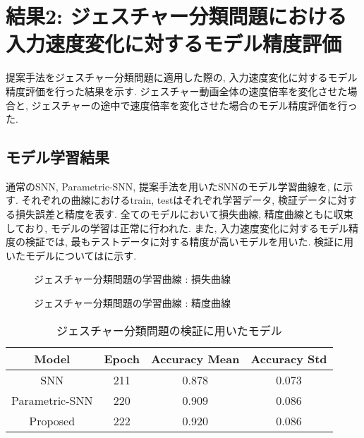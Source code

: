\section{結果2: ジェスチャー分類問題における入力速度変化に対するモデル精度評価} \label{sec:result2}
提案手法をジェスチャー分類問題に適用した際の, 入力速度変化に対するモデル精度評価を行った結果を示す.
ジェスチャー動画全体の速度倍率を変化させた場合と, ジェスチャーの途中で速度倍率を変化させた場合のモデル精度評価を行った.

\subsection{モデル学習結果}
通常のSNN, Parametric-SNN, 提案手法を用いたSNNのモデル学習曲線を, に示す.
それぞれの曲線におけるtrain, testはそれぞれ学習データ, 検証データに対する損失誤差と精度を表す.
全てのモデルにおいて損失曲線, 精度曲線ともに収束しており, モデルの学習は正常に行われた.
また, 入力速度変化に対するモデル精度の検証では, 最もテストデータに対する精度が高いモデルを用いた.
検証に用いたモデルについてはに示す.
\begin{figure}[htb]
    \centering
    
    \caption{ジェスチャー分類問題の学習曲線 : 損失曲線}
    \label{fig:result2:losscurve}
\end{figure}
\begin{figure}[htb]
    \centering
    
    \caption{ジェスチャー分類問題の学習曲線 : 精度曲線}
    \label{fig:result2:acccurve}
\end{figure}

\begin{table}[htb]
    \centering
    \caption{ジェスチャー分類問題の検証に用いたモデル}
    \label{tab:result2:model:parameter}
    \begin{tabular}{cccc}
        \hline
        \textbf{Model}& \textbf{Epoch} & \textbf{Accuracy Mean} & \textbf{Accuracy Std}\\
        \hline
        SNN &  211 & 0.878 & 0.073\\
        Parametric-SNN & 220 & 0.909 & 0.086\\
        Proposed & 222 & 0.920 & 0.086\\
        \hline
    \end{tabular}
\end{table}
\clearpage

